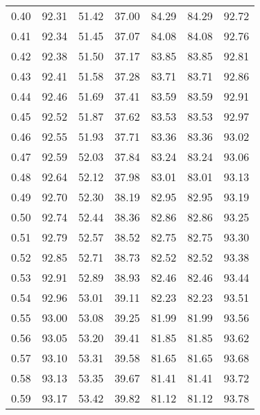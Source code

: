 \begin{tabular}{|c|c|c|c|c|c|c|}
      0.40 &     92.31 &     51.42 &      37.00 &   84.29 &      84.29 &         92.72 \\
      0.41 &     92.34 &     51.45 &      37.07 &   84.08 &      84.08 &         92.76 \\
      0.42 &     92.38 &     51.50 &      37.17 &   83.85 &      83.85 &         92.81 \\
      0.43 &     92.41 &     51.58 &      37.28 &   83.71 &      83.71 &         92.86 \\
      0.44 &     92.46 &     51.69 &      37.41 &   83.59 &      83.59 &         92.91 \\
      0.45 &     92.52 &     51.87 &      37.62 &   83.53 &      83.53 &         92.97 \\
      0.46 &     92.55 &     51.93 &      37.71 &   83.36 &      83.36 &         93.02 \\
      0.47 &     92.59 &     52.03 &      37.84 &   83.24 &      83.24 &         93.06 \\
      0.48 &     92.64 &     52.12 &      37.98 &   83.01 &      83.01 &         93.13 \\
      0.49 &     92.70 &     52.30 &      38.19 &   82.95 &      82.95 &         93.19 \\
      0.50 &     92.74 &     52.44 &      38.36 &   82.86 &      82.86 &         93.25 \\
      0.51 &     92.79 &     52.57 &      38.52 &   82.75 &      82.75 &         93.30 \\
      0.52 &     92.85 &     52.71 &      38.73 &   82.52 &      82.52 &         93.38 \\
      0.53 &     92.91 &     52.89 &      38.93 &   82.46 &      82.46 &         93.44 \\
      0.54 &     92.96 &     53.01 &      39.11 &   82.23 &      82.23 &         93.51 \\
      0.55 &     93.00 &     53.08 &      39.25 &   81.99 &      81.99 &         93.56 \\
      0.56 &     93.05 &     53.20 &      39.41 &   81.85 &      81.85 &         93.62 \\
      0.57 &     93.10 &     53.31 &      39.58 &   81.65 &      81.65 &         93.68 \\
      0.58 &     93.13 &     53.35 &      39.67 &   81.41 &      81.41 &         93.72 \\
      0.59 &     93.17 &     53.42 &      39.82 &   81.12 &      81.12 &         93.78 \\

\end{tabular}
